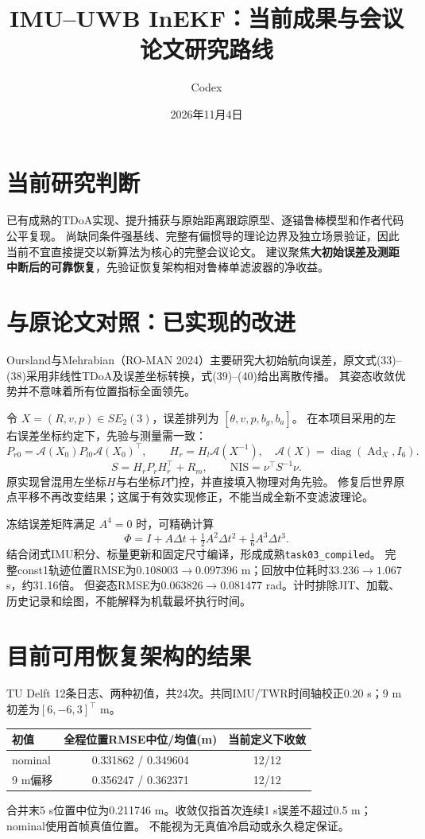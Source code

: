 \documentclass[11pt,a4paper]{ctexart}
\title{IMU--UWB InEKF：当前成果与会议论文研究路线}
\author{Codex}
\date{2026年11月4日}
\begin{document}
\maketitle
\section{当前研究判断}
已有成熟的TDoA实现、提升捕获与原始距离跟踪原型、逐锚鲁棒模型和作者代码公平复现。
尚缺同条件强基线、完整有偏惯导的理论边界及独立场景验证，因此当前不宜直接提交以新算法为核心的完整会议论文。
建议聚焦\textbf{大初始误差及测距中断后的可靠恢复}，先验证恢复架构相对鲁棒单滤波器的净收益。

\section{与原论文对照：已实现的改进}
Oursland与Mehrabian（RO-MAN 2024）主要研究大初始航向误差，原文式(33)--(38)采用非线性TDoA及误差坐标转换，式(39)--(40)给出离散传播。
其姿态收敛优势并不意味着所有位置指标全面领先。

令 $X=(R,v,p)\in SE_2(3)$，误差排列为 $[\theta,v,p,b_g,b_a]$。
在本项目采用的左右误差坐标约定下，先验与测量需一致：
\begin{equation}
 P_{r0}=\mathcal A(X_0)P_{l0}\mathcal A(X_0)^\top,\qquad
 H_r=H_l\mathcal A(X^{-1}),\quad
 \mathcal A(X)=\operatorname{diag}(\operatorname{Ad}_X,I_6).
\end{equation}
\begin{equation}
 S=H_rP_rH_r^\top+R_m,\qquad \mathrm{NIS}=\nu^\top S^{-1}\nu .
\end{equation}
原实现曾混用左坐标$H$与右坐标$P$门控，并直接填入物理对角先验。
修复后世界原点平移不再改变结果；这属于有效实现修正，不能当成全新不变滤波理论。

冻结误差矩阵满足 $A^4=0$ 时，可精确计算
\begin{equation}
 \Phi=I+A\Delta t+\tfrac12 A^2\Delta t^2+\tfrac16 A^3\Delta t^3.
\end{equation}
结合闭式IMU积分、标量更新和固定尺寸编译，形成成熟\texttt{task03\_compiled}。
完整const1轨迹位置RMSE为$0.108003\to0.097396$ m；回放中位耗时$33.236\to1.067$ s，约31.16倍。
但姿态RMSE为$0.063826\to0.081477$ rad。计时排除JIT、加载、历史记录和绘图，不能解释为机载最坏执行时间。

\newpage
\section{目前可用恢复架构的结果}
TU Delft 12条日志、两种初值，共24次。共同IMU/TWR时间轴校正0.20 s；9 m初差为$[6,-6,3]^\top$ m。
\begin{center}
\begin{tabular}{lcc}
\toprule
初值 & 全程位置RMSE中位/均值(m) & 当前定义下收敛\\
\midrule
nominal & 0.331862 / 0.349604 & 12/12\\
9 m偏移 & 0.356247 / 0.362371 & 12/12\\
\bottomrule
\end{tabular}
\end{center}
合并末5 s位置中位为0.211746 m。收敛仅指首次连续1 s误差不超过0.5 m；nominal使用首帧真值位置。
不能视为无真值冷启动或永久稳定保证。
\end{document}
